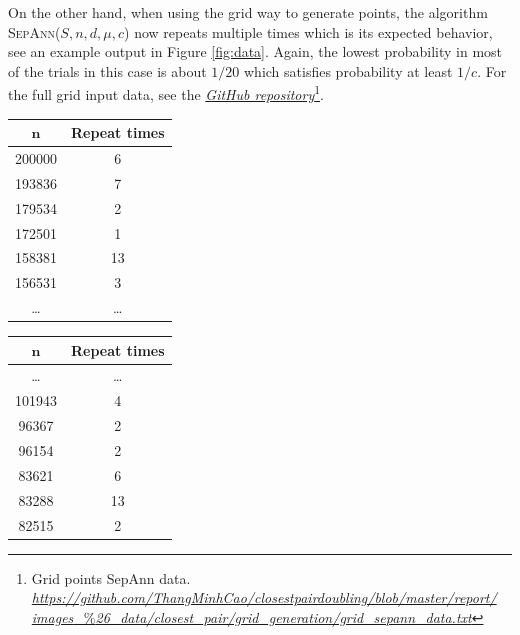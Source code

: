 \documentclass[12pt,english,]{article}
\let\origfigure\figure
\let\endorigfigure\endfigure
\renewenvironment{figure}[1][2] {
    \expandafter\origfigure\expandafter[H]
} {
    \endorigfigure
}
\begin{document}
On the other hand, when using the grid way to generate points, the
algorithm \textsc{SepAnn($S,n,d,\mu,c$)} now repeats multiple times
which is its expected behavior, see an example output in Figure
\ref{fig:data}. Again, the lowest probability in most of the trials in
this case is about \(1/20\) which satisfies probability at least
\(1/c\). For the full grid input data, see the
\href{https://github.com/ThangMinhCao/closestpairdoubling/blob/master/report/images_\%26_data/closest_pair/grid_generation/grid_sepann_data.txt}{\emph{GitHub
repository}}\footnote{Grid points SepAnn data.
  \href{https://github.com/ThangMinhCao/closestpairdoubling/blob/master/report/images_\%26_data/closest_pair/grid_generation/grid_sepann_data.txt}{\emph{https://github.com/ThangMinhCao/closestpairdoubling/blob/master/report/}
  \emph{images}\_\%\emph{26\_data/closest\_pair/grid\_generation/grid\_sepann\_data.txt}}}.

\begin{figure}
\begin{minipage}{0.48\textwidth}
  \centering
  \begin{tabular}{|c|c|}
  \hline
  $\boldsymbol n$   & \textbf{Repeat times} \\ \hline
   200000  & 6            \\ \hline
   193836  & 7            \\ \hline
   179534  & 2            \\ \hline
   172501  & 1            \\ \hline
   158381  & 13           \\ \hline
   156531  & 3            \\ \hline
  \ldots   & \ldots       \\ \hline
  \end{tabular}
\end{minipage}
\begin{minipage}{0.48\textwidth}
  \centering
  \begin{tabular}{|c|c|}
  \hline
  $\boldsymbol n$   & \textbf{Repeat times} \\ \hline
  \ldots   & \ldots       \\ \hline
  101943   & 4            \\ \hline
   96367   & 2            \\ \hline
   96154   & 2            \\ \hline
   83621   & 6            \\ \hline
   83288   & 13           \\ \hline
   82515   & 2            \\ \hline
  \end{tabular}
\end{minipage}
\caption[Caption]{Given an input of $200\,000$ points generated in a grid. This is a portion of the data about the number of times the algorithm \textsc{SepAnn$(S,n,d,\mu,c)$} repeats.}
\label{fig:data}
\end{figure}
\end{document}
